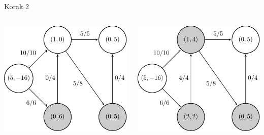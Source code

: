 \documentclass{beamer}
\begin{document}
\begin{frame}{Korak 2}
    \begin{columns}
        \begin{column}{0.5\textwidth}
            \centering
            \includegraphics[scale=0.7]{../writing/images/graf2-3.pdf}
        \end{column}

        \begin{column}{0.5\textwidth}
            \centering
            \includegraphics[scale=0.7]{../writing/images/graf2-4.pdf}
        \end{column}
    \end{columns}
\end{frame}
\end{document}

